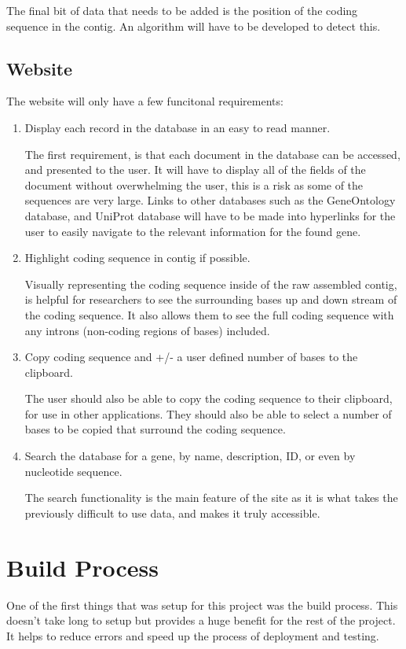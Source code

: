 The final bit of data that needs to be added is the position of the coding sequence in the contig. An algorithm will have to be developed to detect this.

\subsection{Website}
The website will only have a few funcitonal requirements: 

\begin{enumerate}[label=FR\arabic*]
  \item Display each record in the database in an easy to read manner. 

    The first requirement, is that each document in the database can be accessed, and presented to the user. It will have to display all of the fields of the document without overwhelming the user, this is a risk as some of the sequences are very large. Links to other databases such as the GeneOntology database, and UniProt database will have to be made into hyperlinks for the user to easily navigate to the relevant information for the found gene. 

  \item Highlight coding sequence in contig if possible.

    Visually representing the coding sequence inside of the raw assembled contig, is helpful for researchers to see the surrounding bases up and down stream of the coding sequence. It also allows them to see the full coding sequence with any introns (non-coding regions of bases) included. 

  \item Copy coding sequence and +/- a user defined number of bases to the clipboard.

    The user should also be able to copy the coding sequence to their clipboard, for use in other applications. They should also be able to select a number of bases to be copied that surround the coding sequence. 

  \item Search the database for a gene, by name, description, ID, or even by nucleotide sequence. 

    The search functionality is the main feature of the site as it is what takes the previously difficult to use data, and makes it truly accessible. 
\end{enumerate}


\section{Build Process}
  One of the first things that was setup for this project was the build process. This doesn't take long to setup but provides a huge benefit for the rest of the project. It helps to reduce errors and speed up the process of deployment and testing.

